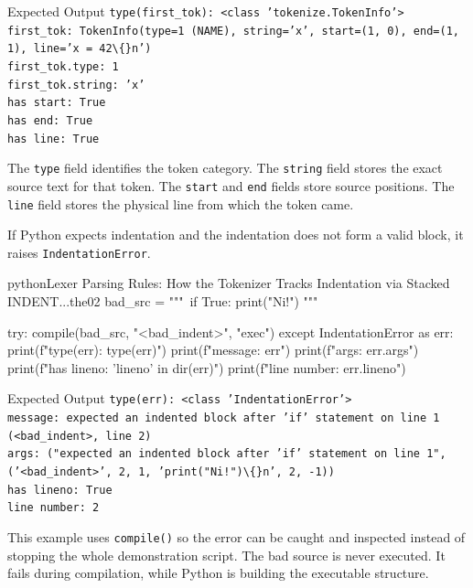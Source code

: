 \documentclass[a4paper,twoside]{report}
\begin{document}
\begin{iobox}{Expected Output}
\texttt{type(first\_tok): <class 'tokenize.TokenInfo'>} \\
\texttt{first\_tok: TokenInfo(type=1 (NAME), string='x', start=(1, 0), end=(1, 1), line='x = 42\textbackslash\{\}n')} \\
\texttt{first\_tok.type: 1} \\
\texttt{first\_tok.string: 'x'} \\
\texttt{has start: True} \\
\texttt{has end: True} \\
\texttt{has line: True} \\
\end{iobox}


The \texttt{type} field identifies the token category. The \texttt{string} field stores the exact source text for that token. The \texttt{start} and \texttt{end} fields store source positions. The \texttt{line} field stores the physical line from which the token came.

If Python expects indentation and the indentation does not form a valid block, it raises \texttt{IndentationError}.

\begin{codebox}[]{python}{Lexer Parsing Rules: How the Tokenizer Tracks Indentation via Stacked INDENT...}{the02}
bad_src = """\
if True:
print("Ni!")
"""

try:
    compile(bad_src, "<bad_indent>", "exec")
except IndentationError as err:
    print(f"type(err): {type(err)}")
    print(f"message: {err}")
    print(f"args: {err.args}")
    print(f"has lineno: {'lineno' in dir(err)}")
    print(f"line number: {err.lineno}")
\end{codebox}


\begin{iobox}{Expected Output}
\texttt{type(err): <class 'IndentationError'>} \\
\texttt{message: expected an indented block after 'if' statement on line 1 (<bad\_indent>, line 2)} \\
\texttt{args: ("expected an indented block after 'if' statement on line 1", ('<bad\_indent>', 2, 1, 'print("Ni!")\textbackslash\{\}n', 2, -1))} \\
\texttt{has lineno: True} \\
\texttt{line number: 2} \\
\end{iobox}


This example uses \texttt{compile()} so the error can be caught and inspected instead of stopping the whole demonstration script. The bad source is never executed. It fails during compilation, while Python is building the executable structure.
\end{document}
